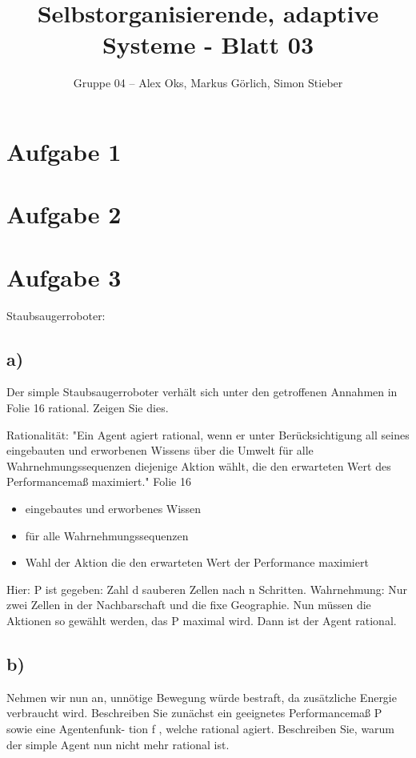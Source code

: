 \documentclass[10pt]{article}%
\theoremstyle{nonumberplain}
\begin{document}
\author{Gruppe 04 -- Alex Oks, Markus Görlich, Simon Stieber}
\title{Selbstorganisierende, adaptive Systeme - Blatt 03}

\maketitle %
\section{Aufgabe 1}

\section{Aufgabe 2}

\section{Aufgabe 3}
Staubsaugerroboter:
\subsection{a)}
Der simple Staubsaugerroboter verhält sich unter den getroffenen Annahmen in Folie 16
rational. Zeigen Sie dies.

Rationalität:
"Ein Agent agiert rational, wenn er unter Berücksichtigung all seines
eingebauten und erworbenen Wissens über die Umwelt für alle
Wahrnehmungssequenzen diejenige Aktion wählt, die den erwarteten
Wert des Performancemaß maximiert." Folie 16

\begin{itemize}
	\item eingebautes und erworbenes Wissen
	\item für alle Wahrnehmungssequenzen
	\item Wahl der Aktion die den erwarteten Wert der Performance maximiert
\end{itemize}

Hier: P ist gegeben: Zahl d sauberen Zellen nach n Schritten.
Wahrnehmung: Nur zwei Zellen in der Nachbarschaft und die fixe Geographie.
Nun müssen die Aktionen so gewählt werden, das P maximal wird.
Dann ist der Agent rational.

\subsection{b)}
Nehmen wir nun an, unnötige Bewegung würde bestraft, da zusätzliche Energie verbraucht
wird. Beschreiben Sie zunächst ein geeignetes Performancemaß P sowie eine Agentenfunk-
tion f , welche rational agiert. Beschreiben Sie, warum der simple Agent nun nicht mehr
rational ist.
\end{document}
